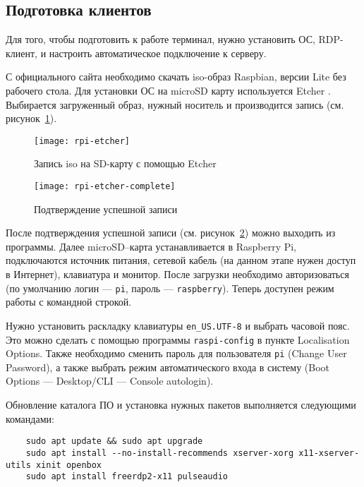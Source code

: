 \subsection{Подготовка клиентов}

Для того, чтобы подготовить к работе терминал, нужно установить ОС, RDP-клиент, и 
настроить автоматическое подключение к серверу.

С официального сайта \cite{ref:raspbian} необходимо скачать iso-образ Raspbian, версии
Lite без рабочего стола. Для установки ОС на microSD карту используется Etcher
\cite{ref:etcher}. Выбирается загруженный образ, нужный носитель и производится запись
(см. рисунок~\ref{pic:rpi-etcher}).

\begin{figure}[h]
    \center
    \texttt{[image: rpi-etcher]}
    \caption{Запись iso на SD-карту с помощью Etcher}
    \label{pic:rpi-etcher}
\end{figure}

\begin{figure}[h]
    \center
    \texttt{[image: rpi-etcher-complete]}
    \caption{Подтверждение успешной записи}
    \label{pic:rpi-etcher-complete}
\end{figure}

После подтверждения успешной записи (см. рисунок~\ref{pic:rpi-etcher-complete}) можно
выходить из программы. Далее microSD–карта устанавливается в Raspberry Pi, подключаются
источник питания, сетевой кабель (на данном этапе нужен доступ в Интернет), клавиатура 
и монитор. После загрузки необходимо авторизоваться (по умолчанию логин — 
\texttt{pi}, пароль — \texttt{raspberry}). Теперь доступен режим работы с командной
строкой.

Нужно установить раскладку клавиатуры \texttt{en\_US.UTF-8} и выбрать часовой пояс. Это можно
сделать с помощью программы \texttt{raspi-config} в пункте Localisation Options. Также
необходимо сменить пароль для пользователя \texttt{pi} (Change User Password), а также
выбрать режим автоматического входа в систему (Boot Options — Desktop/CLI — Console
autologin).

Обновление каталога ПО и установка нужных пакетов выполняется следующими командами:
\begin{verbatim}
    sudo apt update && sudo apt upgrade
    sudo apt install --no-install-recommends xserver-xorg x11-xserver-utils xinit openbox
    sudo apt install freerdp2-x11 pulseaudio
\end{verbatim}

